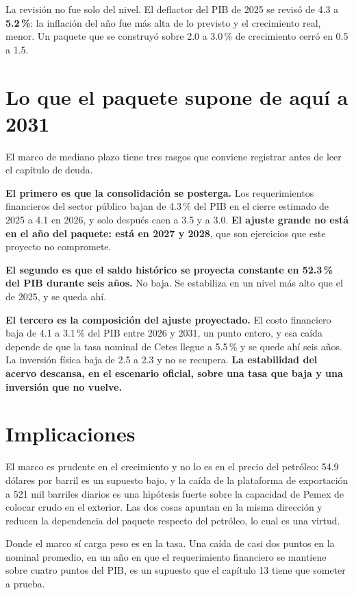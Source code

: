 La revisión no fue solo del nivel. El deflactor del PIB de 2025 se revisó de 4.3 a
\textbf{5.2\,\%}: la inflación del año fue más alta de lo previsto y el crecimiento real,
menor. Un paquete que se construyó sobre 2.0 a 3.0\,\% de crecimiento cerró en 0.5 a 1.5.

\section{Lo que el paquete supone de aquí a 2031}



El marco de mediano plazo tiene tres rasgos que conviene registrar antes de leer el capítulo
de deuda.

\textbf{El primero es que la consolidación se posterga.} Los requerimientos financieros del
sector público bajan de 4.3\,\% del PIB en el cierre estimado de 2025 a 4.1 en 2026, y solo
después caen a 3.5 y a 3.0. \textbf{El ajuste grande no está en el año del paquete: está en
2027 y 2028}, que son ejercicios que este proyecto no compromete.

\textbf{El segundo es que el saldo histórico se proyecta constante en 52.3\,\% del PIB durante
seis años.} No baja. Se estabiliza en un nivel más alto que el de 2025, y se queda ahí.

\textbf{El tercero es la composición del ajuste proyectado.} El costo financiero baja de 4.1 a
3.1\,\% del PIB entre 2026 y 2031, un punto entero, y esa caída depende de que la tasa nominal
de Cetes llegue a 5.5\,\% y se quede ahí seis años. La inversión física baja de 2.5 a 2.3 y no
se recupera. \textbf{La estabilidad del acervo descansa, en el escenario oficial, sobre una
tasa que baja y una inversión que no vuelve.}

\section{Implicaciones}

El marco es prudente en el crecimiento y no lo es en el precio del petróleo: 54.9 dólares por
barril es un supuesto bajo, y la caída de la plataforma de exportación a 521 mil barriles
diarios es una hipótesis fuerte sobre la capacidad de Pemex de colocar crudo en el exterior.
Las dos cosas apuntan en la misma dirección y reducen la dependencia del paquete respecto del
petróleo, lo cual es una virtud.

Donde el marco sí carga peso es en la tasa. Una caída de casi dos puntos en la nominal
promedio, en un año en que el requerimiento financiero se mantiene sobre cuatro puntos del
PIB, es un supuesto que el capítulo 13 tiene que someter a prueba.

